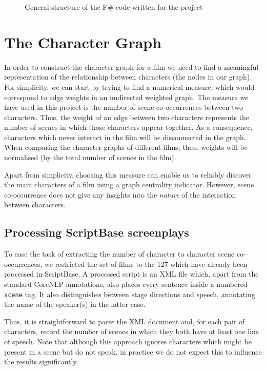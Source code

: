 \documentclass[bsc,frontabs,singlespacing,parskip]{infthesis} %
\begin{document}
\begin{figure}[th!]
\caption{General structure of the F\# code written for the project}
\label{fig:fsharpdirtree}
\end{figure}

\section{The Character Graph}
In order to construct the character graph for a film we need to find a meaningful representation of the relationship between characters (the nodes in our graph). For simplicity, we can start by trying to find a numerical measure, which would correspond to edge weights in an undirected weighted graph. The measure we have used in this project is the number of scene co-occurrences between two characters. Thus, the weight of an edge between two characters represents the number of scenes in which those characters appear together. As a consequence, characters which never interact in the film will be disconnected in the graph. When comparing the character graphs of different films, these weights will be normalised (by the total number of scenes in the film).

Apart from simplicity, choosing this measure can enable us to reliably discover the main characters of a film using a graph centrality indicator. However, scene co-occurrence does not give any insights into the \textit{nature} of the interaction between characters.

\subsection{Processing ScriptBase screenplays}
To ease the task of extracting the number of character to character scene co-occurrences, we restricted the set of films to the 127 which have already been processed in ScriptBase. A processed script is an XML file which, apart from the standard CoreNLP annotations, also places every sentence inside a numbered \texttt{scene} tag. It also distinguishes between stage directions and speech, annotating the name of the speaker(s) in the latter case.

Thus, it is straightforward to parse the XML document and, for each pair of characters, record the number of scenes in which they both have at least one line of speech. Note that although this approach ignores characters which might be present in a scene but do not speak, in practice we do not expect this to influence the results significantly.
\end{document}
